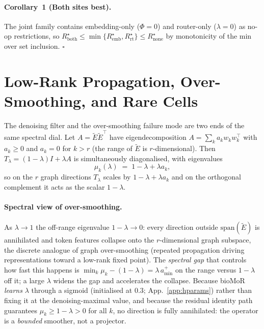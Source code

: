 \documentclass[letterpaper]{article}
\begin{document}
\paragraph{Corollary~1 (Both sites best).} The joint family contains embedding-only ($\Phi{=}0$)
and router-only ($\lambda{=}0$) as no-op restrictions, so
$R^\star_{\mathrm{both}}\le\min\{R^\star_{\mathrm{emb}},R^\star_{\mathrm{rt}}\}\le R^\star_{\mathrm{none}}$
by monotonicity of the min over set inclusion. $\square$

\section{Low-Rank Propagation, Over-Smoothing, and Rare Cells}
\label{app:oversmooth}
The denoising filter and the over-smoothing failure mode are two ends of the same spectral dial. Let
$A=\tilde E\tilde E^\top$ have eigendecomposition $A=\sum_k a_k w_kw_k^\top$ with $a_k\ge0$ and
$a_k{=}0$ for $k>r$ (the range of $\tilde E$ is $r$-dimensional). Then $T_\lambda=(1-\lambda)I+\lambda A$
is simultaneously diagonalised, with eigenvalues
\[
\mu_k(\lambda)\;=\;1-\lambda+\lambda a_k ,
\]
so on the $r$ graph directions $T_\lambda$ scales by $1-\lambda+\lambda a_k$ and on the orthogonal
complement it acts as the scalar $1-\lambda$.

\paragraph{Spectral view of over-smoothing.} As $\lambda\to1$ the off-range eigenvalue $1-\lambda\to0$:
every direction outside $\mathrm{span}(\tilde E)$ is annihilated and token features collapse onto the
$r$-dimensional graph subspace, the discrete analogue of graph over-smoothing (repeated propagation
driving representations toward a low-rank fixed point). The \emph{spectral gap} that controls how fast
this happens is $\min_k \mu_k - (1-\lambda) = \lambda\,a_{\min}^{+}$ on the range versus $1-\lambda$
off it; a large $\lambda$ widens the gap and accelerates the collapse. Because bioMoR \emph{learns}
$\lambda$ through a sigmoid (initialised at $0.3$; App.~\ref{app:hparams}) rather than fixing it at the
denoising-maximal value, and because the residual identity path guarantees $\mu_k\ge 1-\lambda>0$ for
all $k$, no direction is fully annihilated: the operator is a \emph{bounded} smoother, not a projector.
\end{document}
